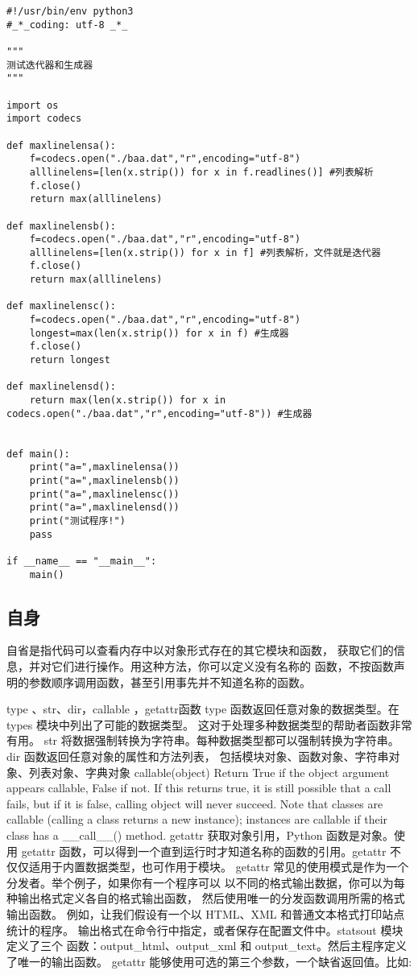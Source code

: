 \documentclass[twoside,11pt]{book}
\begin{document}
\begin{lstlisting}
#!/usr/bin/env python3
#_*_coding: utf-8 _*_

"""
测试迭代器和生成器
"""

import os
import codecs

def maxlinelensa():
    f=codecs.open("./baa.dat","r",encoding="utf-8")
    alllinelens=[len(x.strip()) for x in f.readlines()] #列表解析
    f.close()
    return max(alllinelens)

def maxlinelensb():
    f=codecs.open("./baa.dat","r",encoding="utf-8")
    alllinelens=[len(x.strip()) for x in f] #列表解析，文件就是迭代器
    f.close()
    return max(alllinelens)

def maxlinelensc():
    f=codecs.open("./baa.dat","r",encoding="utf-8")
    longest=max(len(x.strip()) for x in f) #生成器
    f.close()
    return longest

def maxlinelensd():
    return max(len(x.strip()) for x in codecs.open("./baa.dat","r",encoding="utf-8")) #生成器


def main():
    print("a=",maxlinelensa())
    print("a=",maxlinelensb())
    print("a=",maxlinelensc())
    print("a=",maxlinelensd())
    print("测试程序!")
    pass

if __name__ == "__main__":
    main()
\end{lstlisting}


\subsection{自身}
自省是指代码可以查看内存中以对象形式存在的其它模块和函数， 获取它们的信息，并对它们进行操作。用这种方法，你可以定义没有名称的 函数，不按函数声明的参数顺序调用函数，甚至引用事先并不知道名称的函数。

type 、str、dir，callable ，getattr函数
type 函数返回任意对象的数据类型。在 types 模块中列出了可能的数据类型。 这对于处理多种数据类型的帮助者函数非常有用。
str 将数据强制转换为字符串。每种数据类型都可以强制转换为字符串。
dir 函数返回任意对象的属性和方法列表， 包括模块对象、函数对象、字符串对象、列表对象、字典对象
callable(object)
Return True if the object argument appears callable, False if not. If this returns true, it is still possible that a call fails, but if it is false, calling object will never succeed. Note that classes are callable (calling a class returns a new instance); instances are callable if their class has a \_\_call\_\_() method.
getattr 获取对象引用，Python 函数是对象。使用 getattr 函数，可以得到一个直到运行时才知道名称的函数的引用。getattr 不仅仅适用于内置数据类型，也可作用于模块。
getattr 常见的使用模式是作为一个分发者。举个例子，如果你有一个程序可以 以不同的格式输出数据，你可以为每种输出格式定义各自的格式输出函数， 然后使用唯一的分发函数调用所需的格式输出函数。 例如，让我们假设有一个以 HTML、XML 和普通文本格式打印站点统计的程序。 输出格式在命令行中指定，或者保存在配置文件中。statsout 模块定义了三个 函数：output\_html、output\_xml 和 output\_text。然后主程序定义了唯一的输出函数。
getattr 能够使用可选的第三个参数，一个缺省返回值。比如:
\end{document}
